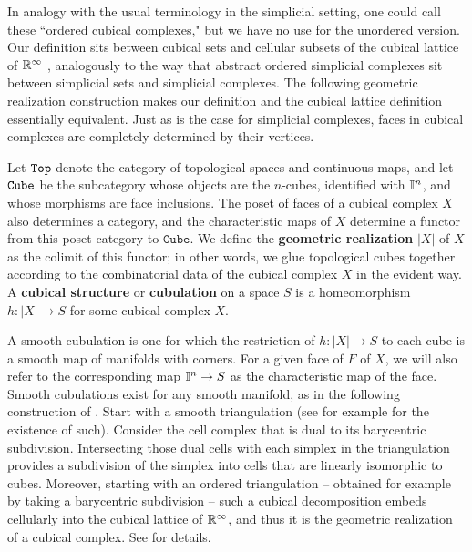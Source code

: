 In analogy with the usual terminology in the simplicial setting, one could call these ``ordered cubical complexes," but we have no use for the unordered version.
Our definition sits between cubical sets \cite{jardine2002cubical} and cellular subsets of the cubical lattice of $\mathbb{R}^\infty$ \cite{kaczynski2006computational}, analogously to the way that abstract ordered simplicial complexes sit between simplicial sets and simplicial complexes.
The following geometric realization construction makes our definition and the cubical lattice definition essentially equivalent.
Just as is the case for simplicial complexes, faces in cubical complexes are completely determined by their vertices.


Let ${\tt Top}$ denote the category of topological spaces and continuous maps, and let ${\tt Cube}$ be the subcategory whose objects are the $n$-cubes, identified with $\mathbb{I}^n$, and whose morphisms are face inclusions.
The poset of faces of a cubical complex $X$ also determines a category, and the characteristic maps of $X$ determine a functor from this poset category to $\mathtt{Cube}$.
We define the \textbf{geometric realization} $|X|$ of $X$ as the colimit of this functor; in other words, we glue topological cubes together according to the combinatorial data of the cubical complex $X$ in the evident way.
A \textbf{cubical structure} or \textbf{cubulation} on a space $S$ is a homeomorphism $h \colon |X| \to S$ for some cubical complex $X$.

\begin{comment}
	We abuse notation and write $h \circ \iota_{|\sigma|}$ simply as $\iota_\sigma$ for any $\sigma \in X$ when a cubical structure $h \colon |X| \to S$ is understood.
\end{comment}

A smooth cubulation is one for which the restriction of $h \colon |X| \to S$ to each cube is a smooth map of manifolds with corners.
For a given face of $F$ of $X$, we will also refer to the corresponding map $\mathbb{I}^n \to S$ as the characteristic map of the face.
Smooth cubulations exist for any smooth manifold, as in the following construction of \cite{ShSh92}.
Start with a smooth triangulation (see for example \cite[Theorem 10.6]{MUNK66} for the existence of such).
Consider the cell complex that is dual to its barycentric subdivision.
Intersecting those dual cells with each simplex in the triangulation provides a subdivision of the simplex into cells that are linearly isomorphic to cubes.
Moreover, starting with an ordered triangulation -- obtained for example by taking a barycentric subdivision -- such a cubical decomposition embeds cellularly into the cubical lattice of $\mathbb{R}^\infty$, and thus it is the geometric realization of a cubical complex.
See \cite{ShSh92} for details.


